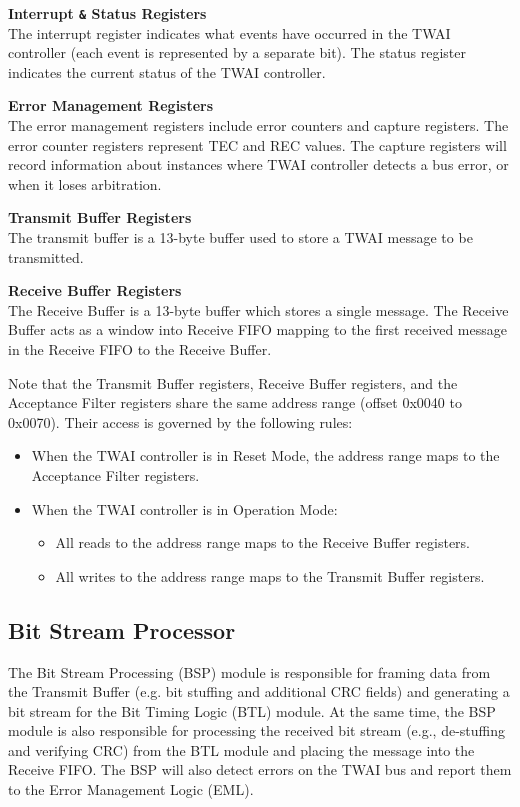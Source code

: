 \documentclass[main\_\_EN.tex]{subfiles}
\begin{document}
{\bfseries Interrupt \verb+&+ Status Registers}\\
The interrupt register indicates what events have occurred in the TWAI controller (each event is represented by a separate bit). The status register indicates the current status of the TWAI controller.

{\bfseries Error Management Registers}\\

The error management registers include error counters and capture registers. The error counter registers
represent TEC and REC values. The capture registers will record information about instances where TWAI controller detects a bus error, or when it loses arbitration.

{\bfseries Transmit Buffer Registers}\\
The transmit buffer is a 13-byte buffer used to store a TWAI message to be transmitted.

{\bfseries Receive Buffer Registers}\\
The Receive Buffer is a 13-byte buffer which stores a single message. The Receive Buffer acts as a window into Receive FIFO mapping to the first received message in the Receive FIFO to the Receive Buffer.

Note that the Transmit Buffer registers, Receive Buffer registers, and the Acceptance Filter registers share the same address range (offset 0x0040 to 0x0070). Their access is governed by the following rules:

\begin{itemize}
    \item When the TWAI controller is in Reset Mode, the address range maps to the Acceptance Filter registers.
    \item When the TWAI controller is in Operation Mode:
    \begin{itemize}
        \item All reads to the address range maps to the Receive Buffer registers.
        \item All writes to the address range maps to the Transmit Buffer registers.
    \end{itemize}
\end{itemize}

\subsection{Bit Stream Processor}
The Bit Stream Processing (BSP) module is responsible for framing data from the Transmit Buffer (e.g. bit stuffing and additional CRC fields) and generating a bit stream for the Bit Timing Logic (BTL) module. At the same time, the BSP module is also responsible for processing the received bit stream (e.g., de-stuffing and verifying CRC) from the BTL module and placing the message into the Receive FIFO. The BSP will also detect errors on the TWAI bus and report them to the Error Management Logic (EML).
\end{document}
